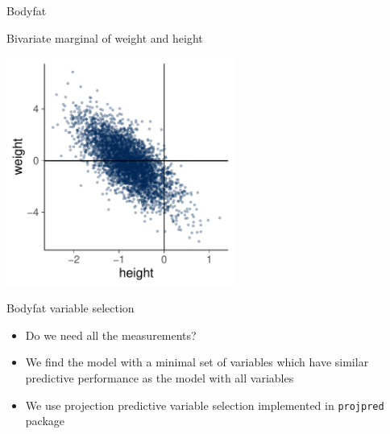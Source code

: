 \documentclass[english,t]{beamer}
\begin{document}
\begin{frame}
  
  {\Large\color{navyblue} Bodyfat}

  Bivariate marginal of weight and height
  
  \includegraphics[width=7.5cm]{bodyfat_mcmc_scatter.pdf}

\end{frame}

\begin{frame}
  
  {\Large\color{navyblue} Bodyfat variable selection}

  \begin{itemize}
  \item<1-> Do we need all the measurements?
  \item<1-> We find the model with a minimal set of variables which have similar predictive performance as the model with all variables
  \item<2-> We use projection predictive variable selection
    implemented in {\tt projpred} package
\end{itemize}
\end{frame}
\end{document}
